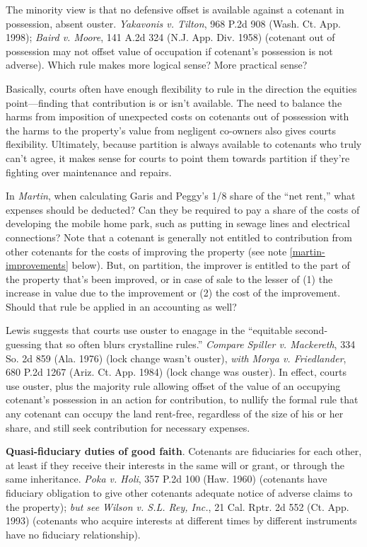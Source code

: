 The minority view is that no defensive offset is available against a cotenant in
possession, absent ouster. \emph{Yakavonis v. Tilton}, 968 P.2d 908 (Wash. Ct.
App. 1998); \emph{Baird v. Moore}, 141 A.2d 324 (N.J. App. Div. 1958) (cotenant
out of possession may not offset value of occupation if cotenant's possession is
not adverse). Which rule makes more logical sense? More practical sense?


Basically, courts often have enough flexibility to rule in the direction the
equities point---finding that contribution is or isn't available. The need to
balance the harms from imposition of unexpected costs on cotenants out of
possession with the harms to the property's value from negligent co-owners also
gives courts flexibility. Ultimately, because partition is always available to
cotenants who truly can't agree, it makes sense for courts to point them
towards partition if they're fighting over maintenance and repairs.


In \textit{Martin}, when calculating Garis and Peggy's 1/8
share of the ``net rent,'' what expenses should be deducted? Can they be
required to pay a share of the costs of developing the mobile home park, such
as putting in sewage lines and electrical connections? Note that a cotenant is
generally not entitled to contribution from other cotenants for the costs of
improving the property (see note \ref{martin-improvements} below). But, on
partition, the improver is entitled to the part of the property that's been
improved, or in case of sale to the lesser of (1) the increase in value due to
the improvement or (2) the cost of the improvement. Should that rule be
applied in an accounting as well?

Lewis suggests that courts use ouster to enagage in the ``equitable
second-guessing that so often blurs crystalline rules.'' \emph{Compare}
\emph{Spiller v. Mackereth}, 334 So. 2d 859 (Ala. 1976) (lock change wasn't
ouster), \emph{with} \emph{Morga v. Friedlander}, 680 P.2d 1267 (Ariz. Ct. App.
1984) (lock change was ouster). In effect, courts use ouster, plus the majority
rule allowing offset of the value of an occupying cotenant's possession in an
action for contribution, to nullify the formal rule that any cotenant can occupy
the land rent-free, regardless of the size of his or her share, and still seek
contribution for necessary expenses.


\item \textbf{Quasi-fiduciary duties of good faith}. Cotenants are fiduciaries
for each other, at least if they receive their interests in the same will or
grant, or through the same inheritance. \emph{Poka v. Holi}, 357 P.2d 100 (Haw.
1960) (cotenants have fiduciary obligation to give other cotenants adequate
notice of adverse claims to the property); \emph{but see} \emph{Wilson v. S.L.
Rey, Inc.}, 21 Cal. Rptr. 2d 552 (Ct. App. 1993) (cotenants who acquire
interests at different times by different instruments have no fiduciary
relationship).


